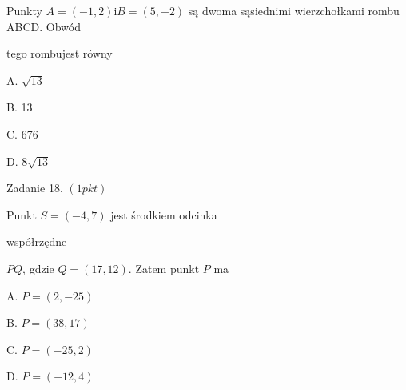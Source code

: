 \documentclass[a4paper,12pt]{article}
\begin{document}
Punkty $A=(-1,2) \mathrm{i}B=(5,-2)$ są dwoma sąsiednimi wierzchołkami rombu ABCD. Obwód

tego rombujest równy

A. $\sqrt{13}$

B. 13

C. 676

D. $8\sqrt{13}$

Zadanie 18. $(1pkt)$

Punkt $S=(-4,7)$ jest środkiem odcinka

współrzędne

$PQ$, gdzie $Q=(17,12)$. Zatem punkt $P$ ma

A. $P=(2,-25)$

B. $P=(38,17)$

C. $P=(-25,2)$

D. $P=(-12,4)$
\end{document}
